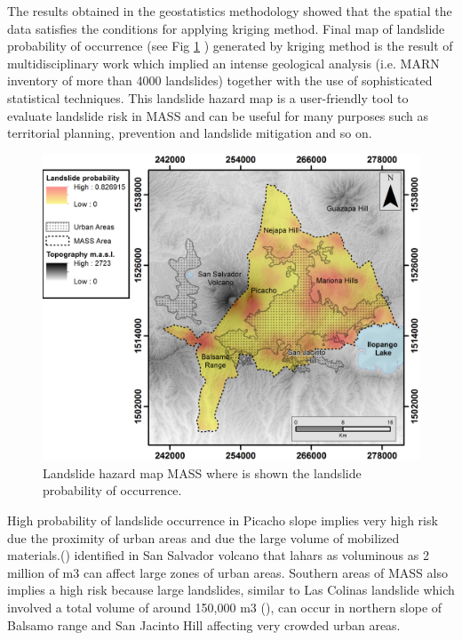 \documentclass[11pt,twoside]{rmta2010esp}%
\begin{document}
The results obtained in the geostatistics methodology showed that the spatial the data satisfies the conditions for applying kriging method. Final map of landslide probability of occurrence (see Fig \ref{fig:mass02} ) generated by kriging method is the result of multidisciplinary work which implied an intense geological analysis (i.e. MARN inventory of more than 4000 landslides) together with the use of sophisticated statistical techniques. This landslide hazard map is a user-friendly tool to evaluate landslide risk in MASS and can be useful for many purposes such as territorial planning, prevention and landslide mitigation and so on. 
\begin{center}
  \begin{figure}
   \centering
   \includegraphics[scale=0.70]{MASS_mapa_2}
   \caption{\small{Landslide hazard map MASS where is shown the landslide probability of occurrence.}}
   \label{fig:mass02}
  \end{figure}
 \end{center}
High probability of landslide occurrence in Picacho slope implies very high risk due the proximity of urban areas and due the large volume of mobilized materials.(\cite{major2004}) identified in San Salvador volcano that lahars as voluminous as 2 million of m3 can affect large zones of urban areas. Southern areas of MASS also implies a high risk because large landslides, similar to Las Colinas landslide which involved a total volume of around 150,000 m3 (\cite{evans}), can occur in northern slope of Balsamo range and San Jacinto Hill affecting very crowded urban areas.
\end{document}
